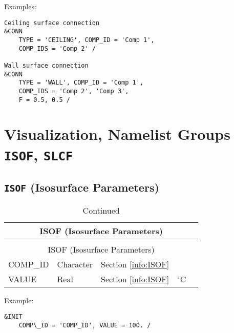 
\vspace{\baselineskip}
\noindent Examples:
\begin{lstlisting}
Ceiling surface connection
&CONN
	TYPE = 'CEILING', COMP_ID = 'Comp 1',
	COMP_IDS = 'Comp 2' /

Wall surface connection
&CONN
	TYPE = 'WALL', COMP_ID = 'Comp 1',
	COMP_IDS = 'Comp 2', 'Comp 3',
	F = 0.5, 0.5 /
\end{lstlisting}




\clearpage
\section{Visualization, Namelist Groups \texorpdfstring{{\tt ISOF}}{ISOF}, \texorpdfstring{{\tt SLCF}}{SLCF}}

\subsection{\texorpdfstring{{\tt ISOF}}{ISOF} (Isosurface Parameters)}

\begin{longtable}{@{\extracolsep{\fill}}|l|l|l|l|l|}
\caption[Isosurface parameters ({\ct ISOF} namelist group)]{For more information see Section~\ref{info:ISOF}.}
\label{tbl:ISOF} \\
\hline
\multicolumn{5}{|c|}{{\ct ISOF} (Isosurface Parameters)} \\
\hline \hline
\endfirsthead
\caption[]{Continued} \\
\hline
\multicolumn{5}{|c|}{{\ct ISOF} (Isosurface Parameters)} \\
\hline \hline
\endhead
{\ct COMP\_ID}        & Character   & Section \ref{info:ISOF}                 &           &                 \\ \hline
{\ct VALUE}             & Real        & Section \ref{info:ISOF}                 & $^\circ$C &                 \\ \hline
\end{longtable}

\noindent Example:
\begin{lstlisting}
&INIT
	COMP\_ID = 'COMP_ID', VALUE = 100. /
\end{lstlisting}




